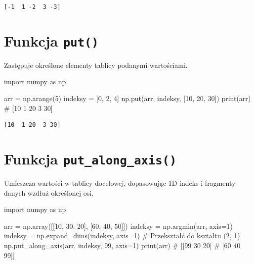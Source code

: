\documentclass[
  letterpaper,
  DIV=11,
  numbers=noendperiod]{scrreprt}
\newenvironment{Shaded}{\begin{snugshade}}{\end{snugshade}}
\newcommand{\BuiltInTok}[1]{\textcolor[rgb]{0.00,0.23,0.31}{#1}}
\newcommand{\CommentTok}[1]{\textcolor[rgb]{0.37,0.37,0.37}{#1}}
\newcommand{\DecValTok}[1]{\textcolor[rgb]{0.68,0.00,0.00}{#1}}
\newcommand{\ImportTok}[1]{\textcolor[rgb]{0.00,0.46,0.62}{#1}}
\newcommand{\NormalTok}[1]{\textcolor[rgb]{0.00,0.23,0.31}{#1}}
\newcommand{\OperatorTok}[1]{\textcolor[rgb]{0.37,0.37,0.37}{#1}}
\begin{document}
\begin{verbatim}
[-1  1 -2  3 -3]
\end{verbatim}

\section{\texorpdfstring{Funkcja
\texttt{put()}}{Funkcja put()}}\label{funkcja-put}

Zastępuje określone elementy tablicy podanymi wartościami.

\begin{Shaded}
\begin{Highlighting}[]
\ImportTok{import}\NormalTok{ numpy }\ImportTok{as}\NormalTok{ np}

\NormalTok{arr }\OperatorTok{=}\NormalTok{ np.arange(}\DecValTok{5}\NormalTok{)}
\NormalTok{indeksy }\OperatorTok{=}\NormalTok{ [}\DecValTok{0}\NormalTok{, }\DecValTok{2}\NormalTok{, }\DecValTok{4}\NormalTok{]}
\NormalTok{np.put(arr, indeksy, [}\DecValTok{10}\NormalTok{, }\DecValTok{20}\NormalTok{, }\DecValTok{30}\NormalTok{])}
\BuiltInTok{print}\NormalTok{(arr)  }\CommentTok{\# [10  1 20  3 30]}
\end{Highlighting}
\end{Shaded}

\begin{verbatim}
[10  1 20  3 30]
\end{verbatim}

\section{\texorpdfstring{Funkcja
\texttt{put\_along\_axis()}}{Funkcja put\_along\_axis()}}\label{funkcja-put_along_axis}

Umieszcza wartości w tablicy docelowej, dopasowując 1D indeks i
fragmenty danych wzdłuż określonej osi.

\begin{Shaded}
\begin{Highlighting}[]
\ImportTok{import}\NormalTok{ numpy }\ImportTok{as}\NormalTok{ np}

\NormalTok{arr }\OperatorTok{=}\NormalTok{ np.array([[}\DecValTok{10}\NormalTok{, }\DecValTok{30}\NormalTok{, }\DecValTok{20}\NormalTok{], [}\DecValTok{60}\NormalTok{, }\DecValTok{40}\NormalTok{, }\DecValTok{50}\NormalTok{]])}
\NormalTok{indeksy }\OperatorTok{=}\NormalTok{ np.argmin(arr, axis}\OperatorTok{=}\DecValTok{1}\NormalTok{)}
\NormalTok{indeksy }\OperatorTok{=}\NormalTok{ np.expand\_dims(indeksy, axis}\OperatorTok{=}\DecValTok{1}\NormalTok{)  }\CommentTok{\# Przekształć do kształtu (2, 1)}
\NormalTok{np.put\_along\_axis(arr, indeksy, }\DecValTok{99}\NormalTok{, axis}\OperatorTok{=}\DecValTok{1}\NormalTok{)}
\BuiltInTok{print}\NormalTok{(arr)}
\CommentTok{\# [[99 30 20]}
\CommentTok{\#  [60 40 99]]}
\end{Highlighting}
\end{Shaded}
\end{document}
